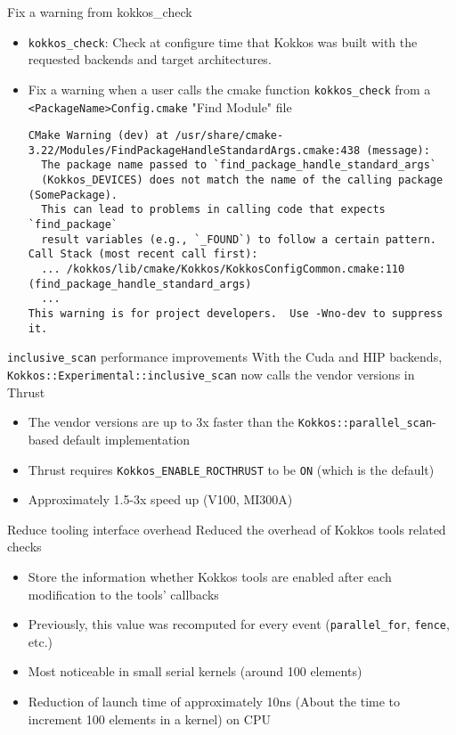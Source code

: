 \begin{frame}[fragile]{Fix a warning from kokkos\_check}
 \begin{itemize}
    \item \texttt{kokkos\_check}: Check at configure time that Kokkos was built with the requested backends and target architectures.
    \item Fix a warning when a user calls the cmake function \texttt{kokkos\_check} from a \texttt{<PackageName>Config.cmake} "Find Module" file
    {\tiny \begin{verbatim}
CMake Warning (dev) at /usr/share/cmake-3.22/Modules/FindPackageHandleStandardArgs.cmake:438 (message):
  The package name passed to `find_package_handle_standard_args`
  (Kokkos_DEVICES) does not match the name of the calling package (SomePackage).
  This can lead to problems in calling code that expects `find_package`
  result variables (e.g., `_FOUND`) to follow a certain pattern.
Call Stack (most recent call first):
  ... /kokkos/lib/cmake/Kokkos/KokkosConfigCommon.cmake:110 (find_package_handle_standard_args)
  ...
This warning is for project developers.  Use -Wno-dev to suppress it.
    \end{verbatim}}
 \end{itemize}
\end{frame}

\begin{frame}[fragile]{\texttt{inclusive\_scan} performance improvements}
  With the Cuda and HIP backends, \texttt{Kokkos::Experimental::inclusive\_scan} now calls the vendor versions in Thrust
  \begin{itemize}
     \item The vendor versions are up to 3x faster than the \texttt{Kokkos::parallel\_scan}-based default implementation
     \item Thrust requires \texttt{Kokkos\_ENABLE\_ROCTHRUST} to be \texttt{ON} (which is the default)
     \item Approximately 1.5-3x speed up (V100, MI300A)
  \end{itemize}
\end{frame}

\begin{frame}[fragile]{Reduce tooling interface overhead}
  Reduced the overhead of Kokkos tools related checks
  \begin{itemize}
      \item Store the information whether Kokkos tools are enabled after each modification to the tools' callbacks
      \item Previously, this value was recomputed for every event (\texttt{parallel\_for}, \texttt{fence}, etc.)
      \item Most noticeable in small serial kernels (around 100 elements)
      \item Reduction of launch time of approximately 10ns (About the time to increment 100 elements in a kernel) on CPU
  \end{itemize}
\end{frame}

